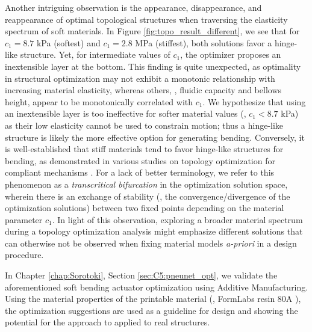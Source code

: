 Another intriguing observation is the appearance, disappearance, and reappearance of optimal topological structures when traversing the elasticity spectrum of soft materials. In Figure \ref{fig:topo_result_different}, we see that for $c_1 = 8.7$ kPa (softest) and $c_1 = 2.8$ MPa (stiffest), both solutions favor a hinge-like structure. Yet, for intermediate values of $c_1$, the optimizer proposes an inextensible layer at the bottom. This finding is quite unexpected, as optimality in structural optimization may not exhibit a monotonic relationship with increasing material elasticity, whereas others, \eg, fluidic capacity and bellows height, appear to be monotonically correlated with $c_1$. We hypothesize that using an inextensible layer is too ineffective for softer material values (\ie, $c_1 < 8.7$ kPa) as their low elasticity cannot be used to constrain motion; thus a hinge-like structure is likely the more effective option for generating bending. Conversely, it is well-established that stiff materials tend to favor hinge-like structures for bending, as demonstrated in various studies on topology optimization for compliant mechanisms \cite{Bendsoe2003, Zhang2017Topo, Luo2016Mar}. For a lack of better terminology, we refer to this phenomenon as a \textit{transcritical bifurcation} in the optimization solution space, wherein there is an exchange of stability (\ie, the convergence/divergence of the optimization solutions) between two fixed points depending on the material parameter $c_1$. In light of this observation, exploring a broader material spectrum during a topology optimization analysis might emphasize different solutions that can otherwise not be observed when fixing material models \textit{a-priori} in a design procedure.

\begin{rmk}[On fabrication] 
In Chapter \ref{chap:Sorotoki}, Section \ref{sec:C5:pneunet_opt}, we validate the aforementioned soft bending actuator optimization using Additive Manufacturing. Using the material properties of the printable material (\ie, FormLabs resin 80A \cite{Xavier2022Jun}), the optimization suggestions are used as a guideline for design and showing the potential for the approach to applied to real structures.
\end{rmk}